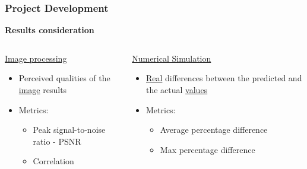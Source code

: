 \documentclass[18pt]{beamer}
\begin{document}
\begin{frame}[t]
  \frametitle{Project Development}
  \large{\textbf{Results consideration}}
  \vspace{-0.5cm}
  \begin{columns}[t]
    \begin{column}{0.5\textwidth}
      \begin{center}
        {\large \underline{Image processing}}
        \begin{itemize}
        \item Perceived qualities of the \underline{image} results
        \item Metrics:
          \begin{itemize}
          \item Peak signal-to-noise ratio - PSNR
          \item Correlation
          \end{itemize}
        \end{itemize}
      \end{center}
    \end{column}
    \begin{column}{0.5\textwidth}
      \begin{center}
        {\large \underline{Numerical Simulation}}
        \begin{itemize}
        \item \underline{Real} differences between the predicted and the actual \underline{values}
        \item Metrics:
          \begin{itemize}
            \item Average percentage difference
            \item Max percentage difference
          \end{itemize}
        \end{itemize}
      \end{center}  
    \end{column}
  \end{columns}
\end{frame}
\end{document}
